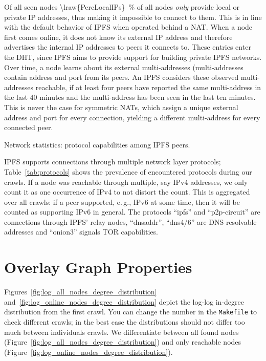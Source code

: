 \documentclass[10pt]{article}
\makeatletter
\newcommand*{\eg}{e.\,g.\@\xspace}
\makeatother
\begin{document}
Of all seen nodes \SI{\lraw{PercLocalIPs}}{\percent} of all nodes \emph{only} provide local or private IP addresses, thus making it impossible to connect to them.
This is in line with the default behavior of IPFS when operated behind a NAT.
When a node first comes online, it does not know its external IP address and therefore advertises the internal IP addresses to peers it connects to.
These entries enter the DHT, since IPFS aims to provide support for building private IPFS networks.
Over time, a node learns about its external multi-addresses (multi-addresses contain address and port from its peers.
An IPFS considers these observed multi-addresses reachable, if at least four peers have reported the same multi-address in the last 40 minutes and the multi-address has been seen in the last ten minutes.
This is never the case for symmetric NATs, which assign a unique external address and port for every connection, yielding a different multi-address for every connected peer.
%
\begin{table}[htb]
  \center
  
  \caption{Network statistics: protocol capabilities among IPFS peers.}
  \label{tab:protocols}
\end{table}
%

IPFS supports connections through multiple network layer protocols; Table~\ref{tab:protocols} shows the prevalence of encountered protocols during our crawls.
If a node was reachable through multiple, say IPv4 addresses, we only count it as one occurrence of IPv4 to not distort the count.
This is aggregated over all crawls: if a peer supported, \eg, IPv6 at some time, then it will be counted as supporting IPv6 in general.
The protocols ``ipfs'' and ``p2p-circuit'' are connections through IPFS' relay nodes, ``dnsaddr'', ``dns4/6'' are DNS-resolvable addresses and ``onion3'' signals TOR capabilities.

\section{Overlay Graph Properties}
\label{sec:graph_properties}

Figures~\ref{fig:log_all_nodes_degree_distribution} and~\ref{fig:log_online_nodes_degree_distribution} depict the log-log in-degree distribution from the first crawl.
You can change the number in the \texttt{Makefile} to check different crawls; in the best case the distributions should not differ too much between individuals crawls.
We differentiate between all found nodes (Figure~\ref{fig:log_all_nodes_degree_distribution}) and only reachable nodes (Figure~\ref{fig:log_online_nodes_degree_distribution}).
\end{document}
